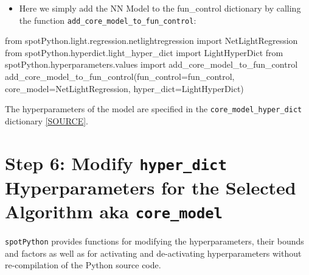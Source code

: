 \documentclass[
  letterpaper,
  DIV=11,
  numbers=noendperiod]{scrreprt}
\newenvironment{Shaded}{\begin{snugshade}}{\end{snugshade}}
\newcommand{\ImportTok}[1]{\textcolor[rgb]{0.00,0.46,0.62}{#1}}
\newcommand{\NormalTok}[1]{\textcolor[rgb]{0.00,0.23,0.31}{#1}}
\newcommand{\OperatorTok}[1]{\textcolor[rgb]{0.37,0.37,0.37}{#1}}
\providecommand{\tightlist}{%
  \setlength{\itemsep}{0pt}\setlength{\parskip}{0pt}}\usepackage{longtable,booktabs,array}
\begin{document}
\begin{itemize}
\tightlist
\item
  Here we simply add the NN Model to the fun\_control dictionary by
  calling the function \texttt{add\_core\_model\_to\_fun\_control}:
\end{itemize}

\begin{Shaded}
\begin{Highlighting}[]
\ImportTok{from}\NormalTok{ spotPython.light.regression.netlightregression }\ImportTok{import}\NormalTok{ NetLightRegression}
\ImportTok{from}\NormalTok{ spotPython.hyperdict.light\_hyper\_dict }\ImportTok{import}\NormalTok{ LightHyperDict}
\ImportTok{from}\NormalTok{ spotPython.hyperparameters.values }\ImportTok{import}\NormalTok{ add\_core\_model\_to\_fun\_control}
\NormalTok{add\_core\_model\_to\_fun\_control(fun\_control}\OperatorTok{=}\NormalTok{fun\_control,}
\NormalTok{                              core\_model}\OperatorTok{=}\NormalTok{NetLightRegression,}
\NormalTok{                              hyper\_dict}\OperatorTok{=}\NormalTok{LightHyperDict)}
\end{Highlighting}
\end{Shaded}

The hyperparameters of the model are specified in the
\texttt{core\_model\_hyper\_dict} dictionary
\href{https://github.com/sequential-parameter-optimization/spotPython/blob/main/src/spotPython/hyperdict/light_hyper_dict.json}{{[}SOURCE{]}}.

\section{\texorpdfstring{Step 6: Modify \texttt{hyper\_dict}
Hyperparameters for the Selected Algorithm aka
\texttt{core\_model}}{Step 6: Modify hyper\_dict Hyperparameters for the Selected Algorithm aka core\_model}}\label{sec-modification-of-hyperparameters-31}

\texttt{spotPython} provides functions for modifying the
hyperparameters, their bounds and factors as well as for activating and
de-activating hyperparameters without re-compilation of the Python
source code.
\end{document}
